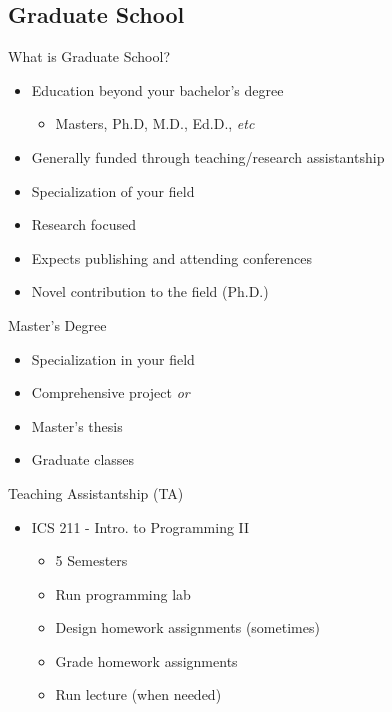\documentclass{beamer}
\begin{document}
\subsection{Graduate School}

\begin{frame}{What is Graduate School?}
\begin{itemize}
	\item Education beyond your bachelor's degree
	\begin{itemize}
		\item Masters, Ph.D, M.D., Ed.D., \emph{etc}
	\end{itemize}
	\item Generally funded through teaching/research assistantship
	\item Specialization of your field
	\item Research focused
	\item Expects publishing and attending conferences
	\item Novel contribution to the field (Ph.D.)
\end{itemize}
\end{frame}

\begin{frame}{Master's Degree}
	\begin{itemize}
		\item Specialization in your field
		\item Comprehensive project \emph{or}
		\item Master's thesis
		\item Graduate classes
	\end{itemize}
\end{frame}

\begin{frame}{Teaching Assistantship (TA)}
\begin{itemize}
	\item ICS 211 - Intro. to Programming II
	\begin{itemize}
		\item 5 Semesters
		\item Run programming lab
		\item Design homework assignments (sometimes)
		\item Grade homework assignments
		\item Run lecture (when needed)
	\end{itemize}
\end{itemize}
\end{frame}
\end{document}
